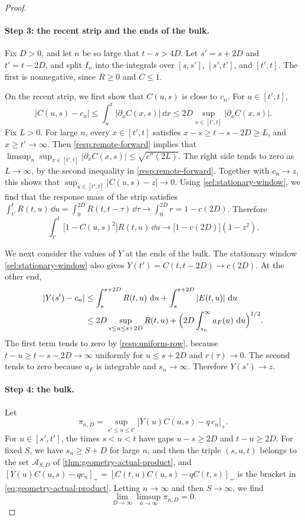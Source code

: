 \begin{proof}
\paragraph{Step 3: the recent strip and the ends of the bulk.}
Fix $D>0$, and let $n$ be so large that $t-s>4D$. Let $s'=s+2D$ and $t'=t-2D$, and split $I_n$ into the integrals over $[s,s']$, $[s',t']$, and $[t',t]$. The first is nonnegative, since $R\ge0$ and $C\le1$.

On the recent strip, we first show that $C(u,s)$ is close to $c_n$. For $u\in[t',t]$,
\[
 |C(u,s)-c_n|\le\int_u^t|\partial_xC(x,s)|\,\dd x\le2D\sup_{x\in[t',t]}|\partial_xC(x,s)| .
\]
Fix $L>0$. For large $n$, every $x\in[t',t]$ satisfies $x-s\ge t-s-2D\ge L$, and $x\ge t'\to\infty$. Then \eqref{resp:remote-forward} implies that $\limsup_n\sup_{x\in[t',t]}|\partial_xC(x,s)|\le\sqrt{c''(2L)}$. The right side tends to zero as $L\to\infty$, by the second inequality in \eqref{resp:remote-forward}. Together with $c_n\to z$, this shows that $\sup_{u\in[t',t]}|C(u,s)-z|\to0$. Using \eqref{sel:stationary-window}, we find that the response mass of the strip satisfies $\int_{t'}^tR(t,u)\,\dd u=\int_0^{2D}R(t,t-\tau)\,\dd\tau\to\int_0^{2D}r=1-c(2D)$. Therefore
\begin{equation}
 \int_{t'}^t\bigl[1-C(u,s)^2\bigr]R(t,u)\,\dd u\longrightarrow\bigl[1-c(2D)\bigr](1-z^2) .
 \label{resp:fisher-upper-strip}
\end{equation}

We next consider the values of $Y$ at the ends of the bulk. The stationary window \eqref{sel:stationary-window} also gives $Y(t')=C(t,t-2D)\to c(2D)$. At the other end,
\begin{align*}
 |Y(s')-c_n|&\le\int_s^{s+2D}R(t,u)\,\mathop{}\!\mathrm d u+\int_s^{s+2D}|E(t,u)|\,\mathop{}\!\mathrm d u\\
 &\le2D\sup_{s\le u\le s+2D}R(t,u)+\Bigl(2D\int_{s_n}^\infty a_F(u)\,\mathop{}\!\mathrm d u\Bigr)^{1/2}.
\end{align*}
The first term tends to zero by \cref{resp:uniform-row}, because $t-u\ge t-s-2D\to\infty$ uniformly for $u\le s+2D$ and $r(\tau)\to0$. The second tends to zero because $a_F$ is integrable and $s_n\to\infty$. Therefore $Y(s')\to z$.

\paragraph{Step 4: the bulk.}
Let
\[
 \pi_{n,D}=\sup_{s'\le u\le t'}\bigl[Y(u)C(u,s)-q\,c_n\bigr]_+ .
\]
For $u\in[s',t']$, the times $s<u<t$ have gaps $u-s\ge2D$ and $t-u\ge2D$. For fixed $S$, we have $s_n\ge S+D$ for large $n$, and then the triple $(s,u,t)$ belongs to the set $\mathcal A_{S,D}$ of \cref{thm:geometry-actual-product}, and $[Y(u)C(u,s)-qc_n]_+=[C(t,u)C(u,s)-qC(t,s)]_+$ is the bracket in \eqref{eq:geometry-actual-product}. Letting $n\to\infty$ and then $S\to\infty$, we find
\begin{equation}\label{eq:fisher-cost-product-error}
 \lim_{D\to\infty}\limsup_{n\to\infty}\pi_{n,D}=0 .
\end{equation}


\end{proof}
